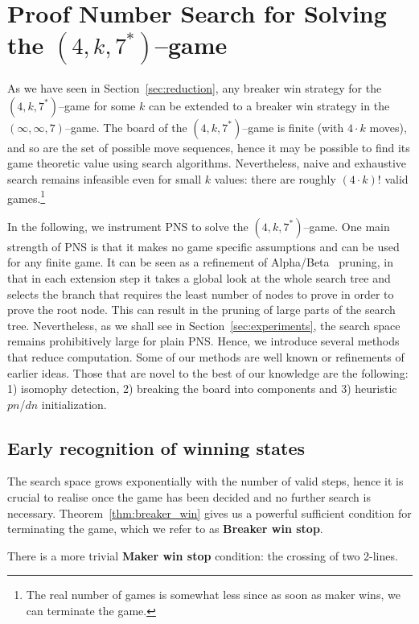 \documentclass[conference]{IEEEtran}
\theoremstyle{definition}
\newcommand{\pn}{$pn$\xspace}
\newcommand{\dn}{$dn$\xspace}
\begin{document}
\section{Proof Number Search for Solving the $(4,k,7^*)$--game}
\label{sec:pns}

As we have seen in Section~\ref{sec:reduction}, any breaker win strategy for the $(4,k,7^*)$--game for some $k$ can be extended to a breaker win strategy in the $(\infty,\infty,7)$--game. The board of the $(4,k,7^*)$--game is finite (with $4 \cdot k$ moves), and so are the set of possible move sequences, hence it may be possible to find its game theoretic value using search algorithms. Nevertheless, naive and exhaustive search remains infeasible even for small $k$ values: there are roughly $(4 \cdot k)!$ valid games.\footnote{The real number of games is somewhat less since as soon as maker wins, we can terminate the game.} 

In the following, we instrument PNS to solve the $(4,k,7^*)$--game. One main strength of PNS is that it makes no game specific assumptions and can be used for any finite game. It can be seen as a refinement of Alpha/Beta~\cite{Bundy1984} pruning, in that in each extension step it takes a global look at the whole search tree and selects the branch that requires the least number of nodes to prove in order to prove the root node. This can result in the pruning of large parts of the search tree. Nevertheless, as we shall see in Section~\ref{sec:experiments}, the search space remains prohibitively large for plain PNS. Hence, we introduce several methods that reduce computation.
Some of our methods are well known or refinements of earlier ideas. Those that are novel to the best of our knowledge are the following: 1) isomophy detection, 2) breaking the board into components and 3) heuristic \pn/\dn initialization. 

\subsection{Early recognition of winning states}
The search space grows exponentially with the number of valid steps, hence it is crucial to realise once the game has been decided and no further search is necessary. Theorem~\ref{thm:breaker_win} gives us a powerful sufficient condition for terminating the game, which we refer to as {\bf Breaker win stop}.

There is a more trivial {\bf Maker win stop} condition: the crossing of two 2-lines.
\end{document}
